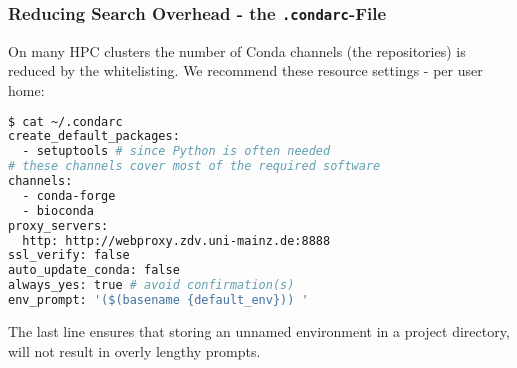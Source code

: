 \begin{frame}[fragile]
  \frametitle{Reducing Search Overhead - the \texttt{.condarc}-File}
  On many HPC clusters the number of Conda channels (the repositories) is reduced by the whitelisting. We recommend these resource settings - per user home:
  \begin{lstlisting}[language=Bash, style=Shell, basicstyle=\tiny]
$ cat ~/.condarc
create_default_packages:
  - setuptools # since Python is often needed
# these channels cover most of the required software
channels:
  - conda-forge
  - bioconda
proxy_servers: 
  http: http://webproxy.zdv.uni-mainz.de:8888
ssl_verify: false
auto_update_conda: false
always_yes: true # avoid confirmation(s)
env_prompt: '($(basename {default_env})) '
  \end{lstlisting}
  The last line ensures that storing an unnamed environment in a project directory, will not result in overly lengthy prompts.
\end{frame}
